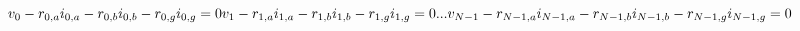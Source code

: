 \documentclass[10pt]{article}
\begin{document}
\[\hspace{-15pt}v_0 - r_{0,a} i_{0,a} - r_{0,b} i_{0,b} - r_{0,g} i_{0,g} = 0 \\
v_1 - r_{1,a} i_{1,a} - r_{1,b} i_{1,b} - r_{1,g} i_{1,g} = 0 \\
...\\
v_{N-1} - r_{N-1,a} i_{N-1,a} - r_{N-1,b} i_{N-1,b} - r_{N-1,g} i_{N-1,g} = 0 \\
\]
\end{document}
